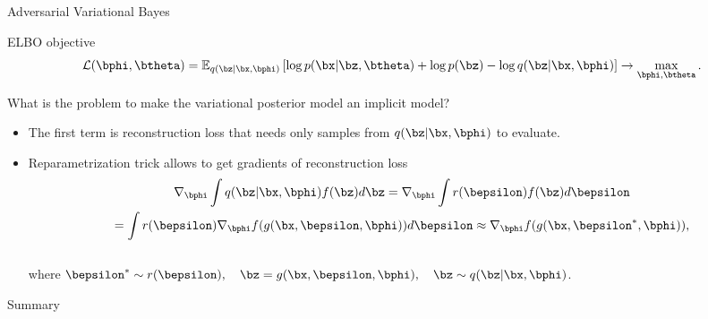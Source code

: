 \begin{frame}{Adversarial Variational Bayes}
	\begin{block}{ELBO objective}
		\vspace{-0.5cm}
		\[
			 \mathcal{L} (\bphi, \btheta)  = \mathbb{E}_{q(\bz | \bx, \bphi)} \left[\log p(\bx | \bz, \btheta) + \log p(\bz) - \log q(\bz| \bx, \bphi) \right] \rightarrow \max_{\bphi, \btheta}.
		\]	
		\vspace{-0.5cm}
	\end{block}
	What is the problem to make the variational posterior model an implicit model?
	\begin{itemize}
	\item The first term is reconstruction loss that needs only samples from $q(\bz | \bx, \bphi)$ to evaluate.
	\item Reparametrization trick allows to get gradients of reconstruction loss
		\vspace{-0.4cm}
		\begin{multline*}
			\nabla_{\bphi}\int q(\bz|\bx, \bphi) f(\bz) d\bz = \nabla_{\bphi}\int r(\bepsilon)  f(\bz) d\bepsilon \\ = \int r(\bepsilon) \nabla_{\bphi} f(g(\bx, \bepsilon, \bphi)) d\bepsilon \approx \nabla_{\bphi} f(g(\bx, \bepsilon^*, \bphi)),
		\end{multline*}
		\vspace{-0.6cm} \\
		where $\bepsilon^* \sim r(\bepsilon), \quad \bz = g(\bx, \bepsilon, \bphi), \quad \bz \sim q(\bz | \bx, \bphi)$.
	\end{itemize}
\end{frame}
		
\begin{frame}{Summary}
\end{frame}
 